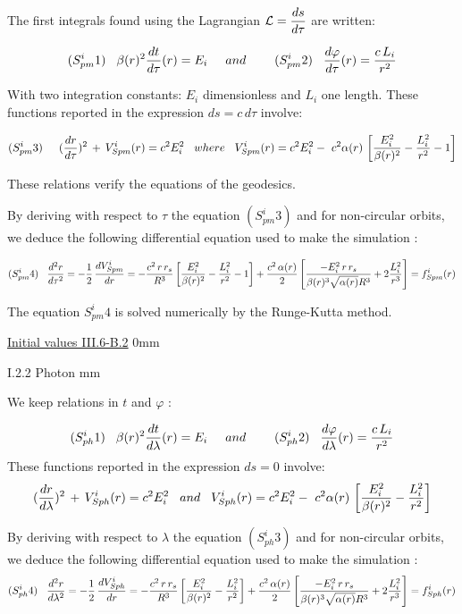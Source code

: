 \documentclass [12pt]{article}
\def\ph#1{\hskip #1}
\def\pv#1{\vskip #1}
\begin{document}
		          
	  	  	 	 	 
		    The first integrals found using the Lagrangian $\mathcal L=\displaystyle{ds\over d\tau}$ are written:
       
      
        $$(S^i_{pm}1) \ph 3mm  \beta(r)^2\displaystyle{dt\over d\tau}(r)=E_i \ph 5mm  and \ph 5mm \ph 3mm (S^i_{pm}2)\ph 3mm {d\varphi\over d\tau}(r) = {c\,L_i\over r^2}$$    
      
       
        With two integration constants: $E_i$ dimensionless and $L_i$ one length. These functions reported in the expression $ds=c\,d\tau$ involve:

      	$$ (S^i_{pm}3)\ph 5mm ({dr\over d\tau})^2\,+\,V^i_{Spm}(r) = c^2 E_i^2 \ph 3mm  where  \ph 3mm  V^i_{Spm}(r)=c^2 E_i^2 - \ c^2\alpha (r)\,\left [\frac{E_i^2}{\beta (r)^2}-\frac{L_i^2}{r^2}-1\right ]$$
	
					  				
		 	 These relations verify the equations of the geodesics. 

		 By deriving with respect to $\tau$ the equation $(S^i_{pm}3)$ and for non-circular orbits, we deduce the following differential equation used to make the simulation :
		\pv-2mm
		
			$$(S^i_{pm}4)\ph 3mm  \frac{d^2r}{d\tau^2}=-\frac{1}{2}\,\frac{dV^i_{Spm}}{dr} = -\frac{c^2\,r\,r_s}{R^3}\left [\frac{E_i^2}{\beta (r)^2}-\frac{L_i^2}{r^2}-1\right ]+
            \frac{c^2\,\alpha(r)}{2}\left [\frac{-E_i^2\,r\,r_s}{\beta(r)^3\sqrt{\alpha(r)}R^3}+2\frac{L_i^2}{r^3}\right ]=f^i_{Spm}(r) $$ 
\pv -2mm
		
		The equation $S^i_{pm}4$ is solved numerically by the Runge-Kutta method.  
	   
		 \hyperlink{B2massif}{Initial values III.6-B.2}
  	  \pv 50mm 
	  
	  	  
	  { I.2.2 Photon}
       \pv 2mm   
		   
     		   We keep relations in $t$ and $\varphi$ :  

		$$(S^i_{ph}1)\ph 3mm \beta(r)^2\displaystyle{dt\over d\lambda}(r)=E_i\ph 5mm  and \ph 5mm \ph 3mm (S^i_{ph}2)\ph 3mm {d\varphi\over d\lambda}(r) = {c\,L_i\over r^2}$$
		 These functions reported in the expression $ds=0$ involve:	  
	 $$ ({dr\over d\lambda})^2\,+\,V^i_{Sph}(r) = c^2 E_i^2 \ph 3mm  and \ph 3mm  V^i_{Sph}(r)=c^2 E_i^2 - \ c^2\alpha (r)\,\left [\frac{E_i^2}{\beta (r)^2}-\frac{L_i^2}{r^2}\right ]$$
	 
	  By deriving with respect to $\lambda$ the equation $(S^i_{ph}3)$ and for non-circular orbits, we deduce the following differential equation used to make the simulation :
			$$(S^i_{ph}4)\ph 3mm  \frac{d^2r}{d\lambda^2}=-\frac{1}{2}\,\frac{dV^i_{Sph}}{dr} = -\frac{c^2\,r\,r_s}{R^3}\left [\frac{E_i^2}{\beta (r)^2}-\frac{L_i^2}{r^2}\right ]+
			\frac{c^2\,\alpha(r)}{2}\left [\frac{-E_i^2\,r\,r_s}{\beta(r)^3\sqrt{\alpha(r)}R^3}+2\frac{L_i^2}{r^3}\right ]=f^i_{Sph}(r) $$ 
	
\end{document}
